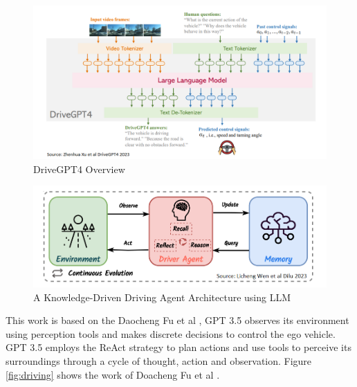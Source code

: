 \begin{spacing}{1.5}
\begin{sloppypar}
\begin{figure}[h]
\begin{center}
\includegraphics[scale=0.7]{2/DriveGPT4_2.png}
\caption{DriveGPT4 Overview}
\label{fig:driveGPT4_2}
\end{center}
\end{figure}


\begin{figure}[h]
\begin{center}
\includegraphics[scale=0.7]{2/Dilu_1.png}
\caption{A Knowledge-Driven Driving Agent Architecture using LLM}
\label{fig:dilu}
\end{center}
\end{figure}

This work is based on the Daocheng Fu et al \cite{fu2023drive}, GPT 3.5  observes its environment using perception tools and makes discrete decisions to control the ego vehicle. GPT 3.5 employs the ReAct strategy to plan actions and use tools to perceive its surroundings through a cycle of thought, action and observation. Figure \ref{fig:driving} shows the work of Doacheng Fu et al \cite{fu2023drive}.


\end{sloppypar}
\end{spacing}
